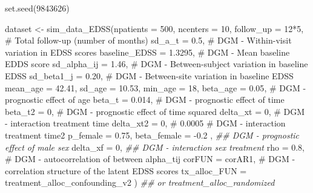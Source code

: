 \documentclass[
  letterpaper,
  DIV=11,
  numbers=noendperiod]{scrreprt}
\newenvironment{Shaded}{\begin{snugshade}}{\end{snugshade}}
\newcommand{\AttributeTok}[1]{\textcolor[rgb]{0.40,0.45,0.13}{#1}}
\newcommand{\CommentTok}[1]{\textcolor[rgb]{0.37,0.37,0.37}{#1}}
\newcommand{\DecValTok}[1]{\textcolor[rgb]{0.68,0.00,0.00}{#1}}
\newcommand{\DocumentationTok}[1]{\textcolor[rgb]{0.37,0.37,0.37}{\textit{#1}}}
\newcommand{\FloatTok}[1]{\textcolor[rgb]{0.68,0.00,0.00}{#1}}
\newcommand{\FunctionTok}[1]{\textcolor[rgb]{0.28,0.35,0.67}{#1}}
\newcommand{\NormalTok}[1]{\textcolor[rgb]{0.00,0.23,0.31}{#1}}
\newcommand{\OtherTok}[1]{\textcolor[rgb]{0.00,0.23,0.31}{#1}}
\newcommand{\SpecialCharTok}[1]{\textcolor[rgb]{0.37,0.37,0.37}{#1}}
\begin{document}
\begin{Shaded}
\begin{Highlighting}[]
\FunctionTok{set.seed}\NormalTok{(}\DecValTok{9843626}\NormalTok{)}

\NormalTok{dataset  }\OtherTok{\textless{}{-}} \FunctionTok{sim\_data\_EDSS}\NormalTok{(}\AttributeTok{npatients =} \DecValTok{500}\NormalTok{,}
                          \AttributeTok{ncenters =} \DecValTok{10}\NormalTok{,}
                          \AttributeTok{follow\_up =} \DecValTok{12}\SpecialCharTok{*}\DecValTok{5}\NormalTok{, }\CommentTok{\# Total follow{-}up (number of months)}
                          \AttributeTok{sd\_a\_t =} \FloatTok{0.5}\NormalTok{,   }\CommentTok{\# DGM {-} Within{-}visit variation in EDSS scores}
                          \AttributeTok{baseline\_EDSS =} \FloatTok{1.3295}\NormalTok{,    }\CommentTok{\# DGM {-} Mean baseline EDDS score}
                          \AttributeTok{sd\_alpha\_ij =} \FloatTok{1.46}\NormalTok{,    }\CommentTok{\# DGM {-} Between{-}subject variation in baseline EDSS}
                          \AttributeTok{sd\_beta1\_j =} \FloatTok{0.20}\NormalTok{,    }\CommentTok{\# DGM {-} Between{-}site variation in baseline EDSS}
                          \AttributeTok{mean\_age =} \FloatTok{42.41}\NormalTok{,}
                          \AttributeTok{sd\_age =} \FloatTok{10.53}\NormalTok{,}
                          \AttributeTok{min\_age =} \DecValTok{18}\NormalTok{,}
                          \AttributeTok{beta\_age =} \FloatTok{0.05}\NormalTok{, }\CommentTok{\# DGM {-} prognostic effect of age}
                          \AttributeTok{beta\_t =} \FloatTok{0.014}\NormalTok{,  }\CommentTok{\# DGM {-} prognostic effect of time}
                          \AttributeTok{beta\_t2 =} \DecValTok{0}\NormalTok{,    }\CommentTok{\# DGM {-} prognostic effect of time squared}
                          \AttributeTok{delta\_xt =} \DecValTok{0}\NormalTok{, }\CommentTok{\# DGM {-} interaction treatment time}
                          \AttributeTok{delta\_xt2 =} \DecValTok{0}\NormalTok{, }\CommentTok{\# 0.0005    \# DGM {-} interaction treatment time2}
                          \AttributeTok{p\_female =} \FloatTok{0.75}\NormalTok{, }
                          \AttributeTok{beta\_female =} \SpecialCharTok{{-}}\FloatTok{0.2}\NormalTok{ ,  }\DocumentationTok{\#\# DGM {-} prognostic effect of male sex}
                          \AttributeTok{delta\_xf =} \DecValTok{0}\NormalTok{,      }\DocumentationTok{\#\# DGM {-} interaction sex treatment       }
                          \AttributeTok{rho =} \FloatTok{0.8}\NormalTok{,             }\CommentTok{\# DGM {-} autocorrelation of between alpha\_tij}
                          \AttributeTok{corFUN =}\NormalTok{ corAR1,       }\CommentTok{\# DGM {-} correlation structure of the latent EDSS scores}
                          \AttributeTok{tx\_alloc\_FUN =}\NormalTok{ treatment\_alloc\_confounding\_v2 ) }\DocumentationTok{\#\# or treatment\_alloc\_randomized}
\end{Highlighting}
\end{Shaded}
\end{document}
